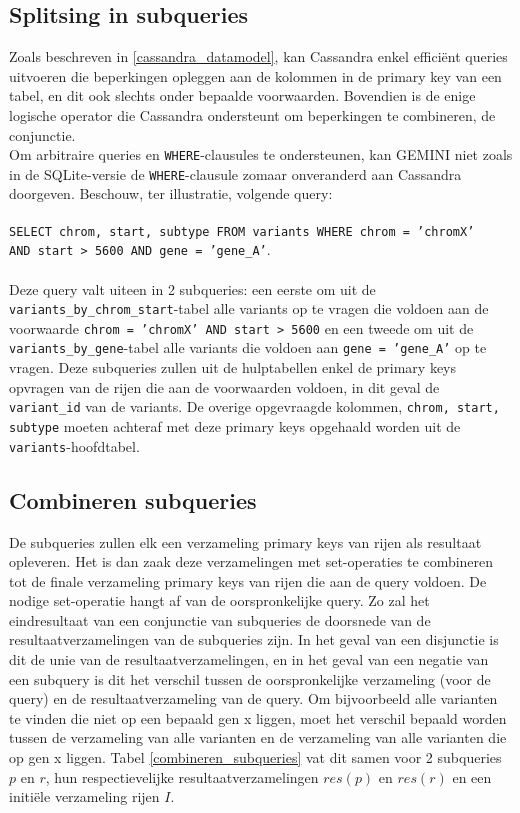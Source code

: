 \subsection{Splitsing in subqueries}
\label{splitsing_subqueries_conceptueel}

Zoals beschreven in \ref{cassandra_datamodel}, kan Cassandra enkel effici\"ent queries uitvoeren die beperkingen opleggen aan de kolommen in de primary key van een tabel, en dit ook slechts onder bepaalde voorwaarden. Bovendien is de enige logische operator die Cassandra ondersteunt om beperkingen te combineren, de conjunctie.\\
Om arbitraire queries en \texttt{WHERE}-clausules te ondersteunen, kan GEMINI niet zoals in de SQLite-versie de \texttt{WHERE}-clausule zomaar onveranderd aan Cassandra doorgeven. Beschouw, ter illustratie, volgende query:\\\\
\texttt{SELECT chrom, start, subtype FROM variants WHERE chrom = 'chromX' \\AND start > 5600 AND gene = 'gene\_A'}.\\\\
Deze query valt uiteen in 2 subqueries: een eerste om uit de \texttt{variants\_by\_chrom\_start}-tabel alle variants op te vragen die voldoen aan de voorwaarde \texttt{chrom = 'chromX' AND start > 5600} en een tweede om uit de \texttt{variants\_by\_gene}-tabel alle variants die voldoen aan \texttt{gene = 'gene\_A'} op te vragen. Deze subqueries zullen uit de hulptabellen enkel de primary keys opvragen van de rijen die aan de voorwaarden voldoen, in dit geval de \texttt{variant\_id} van de variants. De overige opgevraagde kolommen, \texttt{chrom, start, subtype} moeten achteraf met deze primary keys opgehaald worden uit de \texttt{variants}-hoofdtabel.\\

\subsection{Combineren subqueries}
\label{comb_subq_concept}
De subqueries zullen elk een verzameling primary keys van rijen als resultaat opleveren. Het is dan zaak deze verzamelingen met set-operaties te combineren tot de finale verzameling primary keys van rijen die aan de query voldoen. De nodige set-operatie hangt af van de oorspronkelijke query. Zo zal het eindresultaat van een conjunctie van subqueries de doorsnede van de resultaatverzamelingen van de subqueries zijn. In het geval van een disjunctie is dit de unie van de resultaatverzamelingen, en in het geval van een negatie van een subquery is dit het verschil tussen de oorspronkelijke verzameling (voor de query) en de resultaatverzameling van de query. Om bijvoorbeeld alle varianten te vinden die niet op een bepaald gen x liggen, moet het verschil bepaald worden tussen de verzameling van alle varianten en de verzameling van alle varianten die op gen x liggen. Tabel \ref{combineren_subqueries} vat dit samen voor 2 subqueries $p$ en $r$, hun respectievelijke resultaatverzamelingen $res(p)$ en $res(r)$ en een initi\"ele verzameling rijen $I$.

